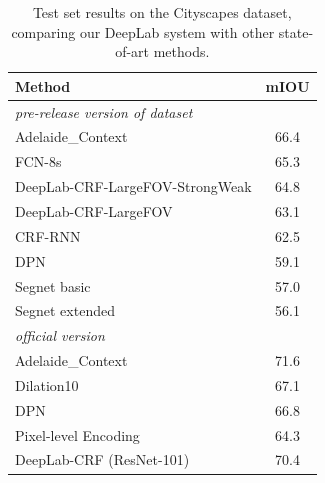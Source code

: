\begin{table}[!t]
  \centering
  \addtolength{\tabcolsep}{2.5pt}
  \begin{tabular}{l | c}
    \toprule[0.2 em]
    {\bf Method} & {\bf mIOU} \\
    \toprule[0.2 em]
    \multicolumn{2}{l}{\it pre-release version of dataset} \\
    Adelaide\_Context \cite{lin2015efficient} & 66.4 \\
    FCN-8s \cite{long2014fully} & 65.3 \\
    \midrule
    DeepLab-CRF-LargeFOV-StrongWeak \cite{papandreou2015weakly} & 64.8 \\
    DeepLab-CRF-LargeFOV \cite{chen2014semantic} & 63.1 \\
    \midrule
    CRF-RNN \cite{zheng2015conditional} & 62.5 \\
    DPN \cite{liu2015semantic} & 59.1 \\
    Segnet basic \cite{badrinarayanan2015segnet} & 57.0 \\
    Segnet extended \cite{badrinarayanan2015segnet} & 56.1 \\
    \midrule \midrule
    \multicolumn{2}{l}{\it official version} \\
    Adelaide\_Context \cite{lin2015efficient} & 71.6 \\
    Dilation10 \cite{yu2015multi} & 67.1 \\
    DPN \cite{liu2015semantic} & 66.8  \\
    Pixel-level Encoding \cite{uhrig2016pixel} & 64.3 \\
    \midrule
    DeepLab-CRF (ResNet-101) & 70.4 \\
    \bottomrule[0.1 em]
  \end{tabular}
  \caption{Test set results on the Cityscapes dataset, comparing our DeepLab system with other state-of-art methods.}
  \label{tab:cityscapes_test}
\end{table}

